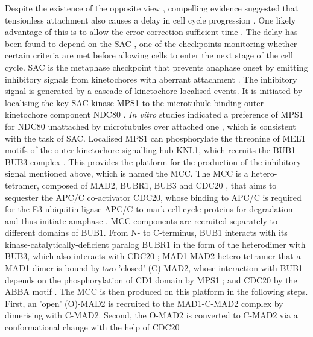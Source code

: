 Despite the existence of the opposite view \citep{Etemad2015KinetochoremicrotubuleCheckpoint, Tauchman2015StableCells, Kuhn2019MammalianManner, Magidson2016UnattachedCells}, compelling evidence suggested that tensionless attachment also causes a delay in cell cycle progression \citep{Biggins2001TheCheckpoint, Pinsky2005TheKinetochores, Uchida2009KinetochoreCheckpoint, Li1995MitoticCheckpoint, Shonn2000RequirementMeiosis, Stern2001LackYeast, King2007Ipl1p-dependentKinetochores, Maresca2009IntrakinetochoreActivity}. One likely advantage of this is to allow the error correction sufficient time \citep{Marston2015}. The delay has been found to depend on the SAC \citep{Indjeian2005a, Pinsky2005TheKinetochores}, one of the checkpoints monitoring whether certain criteria are met before allowing cells to enter the next stage of the cell cycle. SAC is the metaphase checkpoint that prevents anaphase onset by emitting inhibitory signals from kinetochores with aberrant attachment \citep{London2014, Musacchio2011SpindleDecade, Lara-Gonzalez2021SpindleKinetochores, McAinsh2023PrinciplesSignalling}. The inhibitory signal is generated by a cascade of kinetochore-localised events. It is initiated by localising the key SAC kinase MPS1 to the microtubule-binding outer kinetochore component NDC80 \citep{Pachis2018LeaderMitosis}. \textit{In vitro} studies indicated a preference of MPS1 for NDC80 unattached by microtubules over attached one \citep{Ji2015KinetochoreNdc80C, Hiruma2015CompetitionSignaling}, which is consistent with the task of SAC. Localised MPS1 can phosphorylate the threonine of MELT motifs of the outer kinetochore signalling hub KNL1, which recruits the BUB1-BUB3 complex \citep{London2012, Shepperd2012, Yamagishi2012MPS1/Mph1Components, Primorac2013Bub3Signaling}. This provides the platform for the production of the inhibitory signal mentioned above, which is named the MCC. The MCC is a hetero-tetramer, composed of MAD2, BUBR1, BUB3 and CDC20 \citep{Musacchio2015TheDynamics, Kops2020EvolutionaryEukaryotes}, that aims to sequester the APC/C co-activator CDC20, whose binding to APC/C is required for the E3 ubiquitin ligase APC/C to mark cell cycle proteins for degradation and thus initiate anaphase \citep{Sudakin2001CheckpointMAD2, Hardwick2000MAD3Mad2p, Alfieri2016MolecularCheckpoint, Izawa2015TheAPC/C, Tsang2023AlternativeDuration}. MCC components are recruited separately to different domains of BUB1. From N- to C-terminus, BUB1 interacts with its kinase-catalytically-deficient paralog BUBR1 in the form of the heterodimer with BUB3, which also interacts with CDC20 \citep{Suijkerbuijk2012ThePseudokinase, Tromer2016Phylogenomics-guidedCheckpoint, Overlack2015ACheckpoint, Alfieri2016MolecularCheckpoint}; MAD1-MAD2 hetero-tetramer that a MAD1 dimer is bound by two 'closed' (C)-MAD2, whose interaction with BUB1 depends on the phosphorylation of CD1 domain by MPS1 \citep{London2014Mad1Checkpoint, Ji2017ASignaling, Zhang2017Bub1Signalling, Fischer2021MolecularBub1}; and CDC20 by the ABBA motif \citep{DiFiore2015TheRegulators}. The MCC is then produced on this platform in the following steps. First, an 'open' (O)-MAD2 is recruited to the MAD1-C-MAD2 complex by dimerising with C-MAD2. Second, the O-MAD2 is converted to C-MAD2 via a conformational change with the help of CDC20 